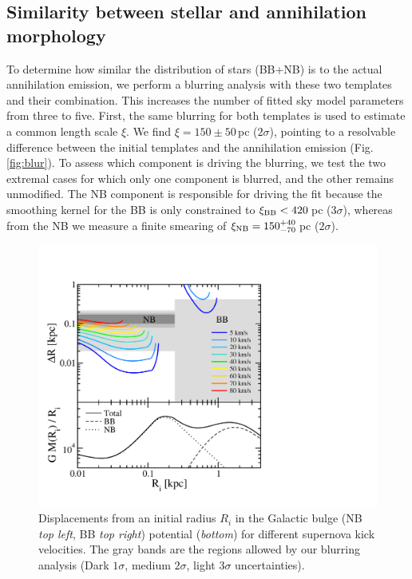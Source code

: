 \documentclass[doublespace,nopageskip]{VTthesis} %
\begin{document}
	
	
	\subsection{Similarity between stellar and annihilation morphology}\label{sec:blurring_analysis}
	To determine how similar the distribution of stars (BB+NB) is to the actual annihilation emission, we perform a blurring analysis with these two templates and their combination.
	This increases the number of fitted sky model parameters from three to five.
	First, the same blurring for both templates is used to estimate a common length scale $\xi$.
	We find $\xi = 150 \pm 50$\,pc ($2\sigma$), pointing to a resolvable difference between the initial templates and the annihilation emission (Fig. \,\ref{fig:blur}).
	To assess which component is driving the blurring, we test the two extremal cases for which only one component is blurred, and the other remains unmodified.
	The NB component is responsible for driving the fit because the smoothing kernel for the BB is only constrained to $\xi_{\rm BB} < 420$\,pc ($3\sigma$), whereas from the NB we measure a finite smearing of $\xi_{\rm NB} = 150^{+40}_{-70}$\,pc ($2\sigma$).
	
	

	\begin{figure}
		\centering
		\includegraphics[width=0.75\columnwidth,trim=0.20in 0.55in 3.7in 1.2in,clip=true]{Figures/511keV/Fig_bulgeblur_total_2.pdf}%
		\caption{Displacements from an initial radius $R_i$ in the Galactic bulge (NB \textit{top left}, BB \textit{top right}) potential (\textit{bottom}) for different supernova kick velocities. The gray bands are the regions allowed by our blurring analysis (Dark $1\sigma$, medium $2\sigma$, light $3\sigma$ uncertainties).}%
		\label{fig:kicks}%
	\end{figure}
	
\end{document}
